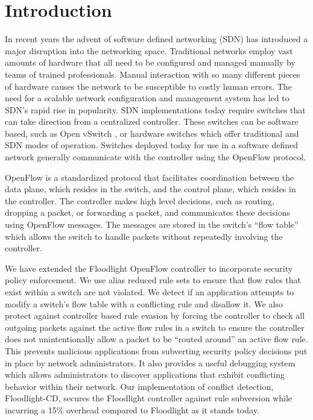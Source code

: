 \section{Introduction}
\label{sec:intro}

In recent years the advent of software defined networking (SDN) has introduced a major disruption into the networking space.
Traditional networks employ vast amounts of hardware that all need to be configured and managed manually by teams of trained professionals.
Manual interaction with so many different pieces of hardware causes the network to be susceptible to costly human errors. 
The need for a scalable network configuration and management system has led to SDN's rapid rise in popularity.
SDN implementations today require switches that can take direction from a centralized controller.
These switches can be software based, such as Open vSwitch \cite{DBLP:conf/hotnets/PfaffPACKS09}, or hardware switches which offer traditional and SDN modes of operation.
Switches deployed today for use in a software defined network generally communicate with the controller using the OpenFlow protocol.

OpenFlow \cite{McKeown:2008:OEI:1355734.1355746} is a standardized protocol that facilitates coordination between the data plane, which resides in the switch, and the control plane, which resides in the controller.
The controller makes high level decisions, such as routing, dropping a packet, or forwarding a packet, and communicates these decisions using OpenFlow messages.
The messages are stored in the switch's ``flow table'' which allows the switch to handle packets without repeatedly involving the controller. 


We have extended the Floodlight OpenFlow controller \cite{floodlight} to incorporate security policy enforcement.
We use alias reduced rule sets to ensure that flow rules that exist within a switch are not violated.
We detect if an application attempts to modify a switch's flow table with a conflicting rule and disallow it.
We also protect against controller based rule evasion by forcing the controller to check all outgoing packets against the active flow rules in a switch to ensure the controller does not unintentionally allow a packet to be ``routed around'' an active flow rule.
This prevents malicious applications from subverting security policy decisions put in place by network administrators.
It also provides a useful debugging system which allows administrators to discover applications that exhibit conflicting behavior within their network.
Our implementation of conflict detection, Floodlight-CD, secures the Floodlight controller against rule subversion while incurring a 15\% overhead compared to Floodlight as it stands today. 

